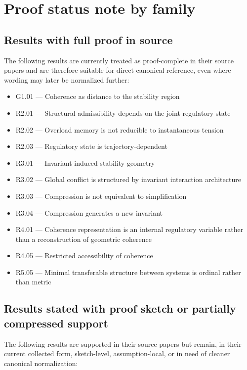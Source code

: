 \documentclass[12pt]{article}
\begin{document}
	\section{Proof status note by family}
	
	\subsection{Results with full proof in source}
	
	The following results are currently treated as proof-complete in their source papers and are
	therefore suitable for direct canonical reference, even where wording may later be normalized
	further:
	
	\begin{itemize}[leftmargin=2em]
		\item G1.01 --- Coherence as distance to the stability region
		\item R2.01 --- Structural admissibility depends on the joint regulatory state
		\item R2.02 --- Overload memory is not reducible to instantaneous tension
		\item R2.03 --- Regulatory state is trajectory-dependent
		\item R3.01 --- Invariant-induced stability geometry
		\item R3.02 --- Global conflict is structured by invariant interaction architecture
		\item R3.03 --- Compression is not equivalent to simplification
		\item R3.04 --- Compression generates a new invariant
		\item R4.01 --- Coherence representation is an internal regulatory variable rather than a reconstruction of geometric coherence
		\item R4.05 --- Restricted accessibility of coherence
		\item R5.05 --- Minimal transferable structure between systems is ordinal rather than metric
	\end{itemize}
	
	\subsection{Results stated with proof sketch or partially compressed support}
	
	The following results are supported in their source papers but remain, in their current collected
	form, sketch-level, assumption-local, or in need of cleaner canonical normalization:
	
\end{document}
